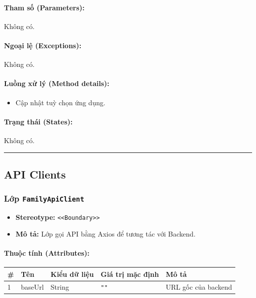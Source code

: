 \documentclass[12pt,a4paper]{article}
\begin{document}
\paragraph{Tham số (Parameters):}
Không có.

\paragraph{Ngoại lệ (Exceptions):}
Không có.

\paragraph{Luồng xử lý (Method details):}
\begin{itemize}[leftmargin=*]
    \item Cập nhật tuỳ chọn ứng dụng.
\end{itemize}


\paragraph{Trạng thái (States):}
Không có.

\vskip 0.5cm
\noindent\rule{\textwidth}{0.5pt}
\vskip 0.5cm

\subsection{API Clients}

\subsubsection{Lớp \texttt{FamilyApiClient}}
\begin{itemize}[leftmargin=*]
    \item \textbf{Stereotype:} \texttt{\textless{}\textless{}Boundary\textgreater{}\textgreater{}}
    \item \textbf{Mô tả:} Lớp gọi API bằng Axios để tương tác với Backend.
\end{itemize}

\paragraph{Thuộc tính (Attributes):}
\begin{longtable}{|p{0.6cm}|p{2.8cm}|p{2.2cm}|p{1.8cm}|p{5.8cm}|}
\hline
\textbf{\#} & \textbf{Tên} & \textbf{Kiểu dữ liệu} & \textbf{Giá trị mặc định} & \textbf{Mô tả} \\ \hline
\endhead
1 & baseUrl & String & \texttt{""} & URL gốc của backend \\ \hline
\end{longtable}
\end{document}
